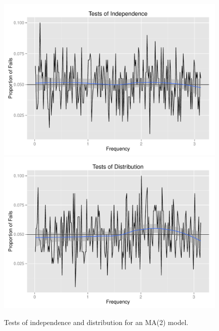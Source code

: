 \documentclass{article}\usepackage{graphicx, color}
\newenvironment{knitrout}{}{} %
\theoremstyle{plain}
\begin{document}
\begin{knitrout}
\color{fgcolor}\begin{figure}[H]

\includegraphics[width=.49\textwidth]{figure/tests-ma21} 
\includegraphics[width=.49\textwidth]{figure/tests-ma22} \caption[Tests of independence and distribution for an MA(2) model]{Tests of independence and distribution for an MA(2) model.\label{fig:tests-ma2}}
\end{figure}


\end{knitrout}
\end{document}
